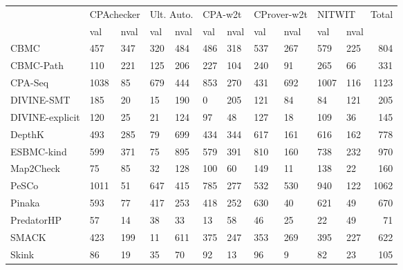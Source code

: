 \documentclass[notitlepage]{article}
\begin{document}
\begin{tabular}{lllllllllllr}
\toprule
{} & \multicolumn{2}{l}{CPAchecker} & \multicolumn{2}{l}{Ult. Auto.} & \multicolumn{2}{l}{CPA-w2t} & \multicolumn{2}{l}{CProver-w2t} & \multicolumn{2}{l}{NITWIT} &  Total \\
{} &        val &  nval &        val &  nval &     val &  nval &         val &  nval &    val & \multicolumn{2}{l}{nval} \\
\midrule
CBMC            &        457 &   347 &        320 &   484 &     486 &   318 &         537 &   267 &    579 &   225 &    804 \\
CBMC-Path       &        110 &   221 &        125 &   206 &     227 &   104 &         240 &    91 &    265 &    66 &    331 \\
CPA-Seq         &       1038 &    85 &        679 &   444 &     853 &   270 &         431 &   692 &   1007 &   116 &   1123 \\
DIVINE-SMT      &        185 &    20 &         15 &   190 &       0 &   205 &         121 &    84 &     84 &   121 &    205 \\
DIVINE-explicit &        120 &    25 &         21 &   124 &      97 &    48 &         127 &    18 &    109 &    36 &    145 \\
DepthK          &        493 &   285 &         79 &   699 &     434 &   344 &         617 &   161 &    616 &   162 &    778 \\
ESBMC-kind      &        599 &   371 &         75 &   895 &     579 &   391 &         810 &   160 &    738 &   232 &    970 \\
Map2Check       &         75 &    85 &         32 &   128 &     100 &    60 &         149 &    11 &    138 &    22 &    160 \\
PeSCo           &       1011 &    51 &        647 &   415 &     785 &   277 &         532 &   530 &    940 &   122 &   1062 \\
Pinaka          &        593 &    77 &        417 &   253 &     418 &   252 &         630 &    40 &    621 &    49 &    670 \\
PredatorHP      &         57 &    14 &         38 &    33 &      13 &    58 &          46 &    25 &     22 &    49 &     71 \\
SMACK           &        423 &   199 &         11 &   611 &     375 &   247 &         353 &   269 &    395 &   227 &    622 \\
Skink           &         86 &    19 &         35 &    70 &      92 &    13 &          96 &     9 &     82 &    23 &    105 \\

\end{tabular}
\end{document}
